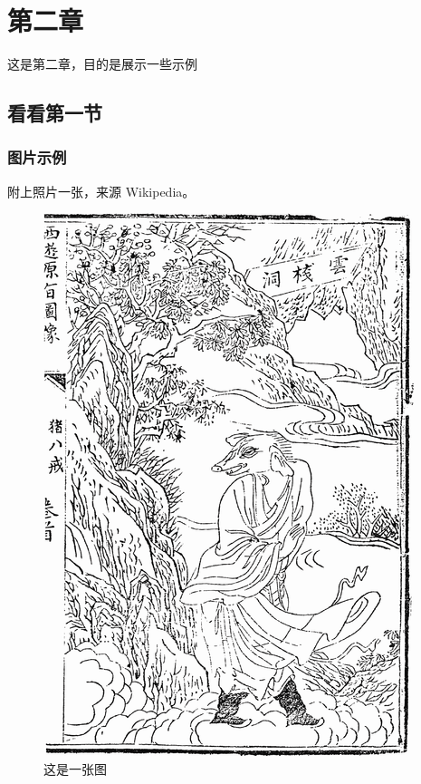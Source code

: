
\chapter{第二章}\label{chap2}

这是第二章，目的是展示一些示例

\section{看看第一节}

\subsection{图片示例}

附上照片一张，来源 Wikipedia。

\begin{figure}[htbp]
  \centering
  \includegraphics[scale=0.5]{./images/zhubajie.png}
  \caption{这是一张图}
  \label{fig:example}
\end{figure}

